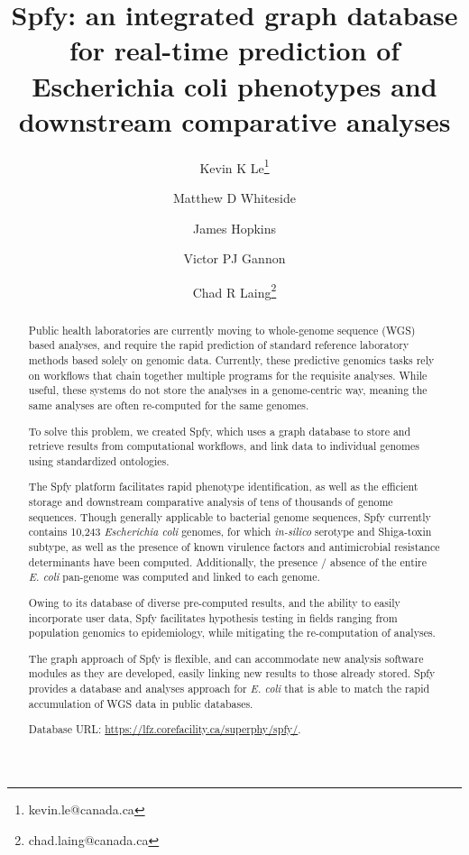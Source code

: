 \documentclass{article}
\begin{document}
\title{Spfy: an integrated graph database for real-time prediction of Escherichia coli phenotypes and downstream comparative analyses}

\author[1]{Kevin K Le\thanks{kevin.le@canada.ca}}
\author[1]{Matthew D Whiteside}
\author[1]{James Hopkins}
\author[1]{Victor PJ Gannon}
\author[1]{Chad R Laing\thanks{chad.laing@canada.ca}}

\renewcommand\Authands{ and }

\maketitle

\begin{abstract}

Public health laboratories are currently moving to whole-genome sequence (WGS) based analyses, and require the rapid prediction of standard reference laboratory methods based solely on genomic data. Currently, these predictive genomics tasks rely on workflows that chain together multiple programs for the requisite analyses. While useful, these systems do not store the analyses in a genome-centric way, meaning the same analyses are often re-computed for the same genomes.

To solve this problem, we created Spfy, which uses a graph database to store and retrieve results from computational workflows, and link data to individual genomes using standardized ontologies.

The Spfy platform facilitates rapid phenotype identification, as well as the efficient storage and downstream comparative analysis of tens of thousands of genome sequences. Though generally applicable to bacterial genome sequences, Spfy currently contains 10,243 \textit{Escherichia coli} genomes, for which \textit{in-silico} serotype and Shiga-toxin subtype, as well as the presence of known virulence factors and antimicrobial resistance determinants have been computed. Additionally, the presence / absence of the entire \textit{E. coli} pan-genome was computed and linked to each genome.

Owing to its database of diverse pre-computed results, and the ability to easily incorporate user data, Spfy facilitates hypothesis testing in fields ranging from population genomics to epidemiology, while mitigating the re-computation of analyses.

The graph approach of Spfy is flexible, and can accommodate new analysis software modules as they are developed, easily linking new results to those already stored. Spfy provides a database and analyses approach for \textit{E. coli} that is able to match the rapid accumulation of WGS data in public databases.
\par

Database URL: \url{https://lfz.corefacility.ca/superphy/spfy/}.

\end{abstract}
\end{document}
